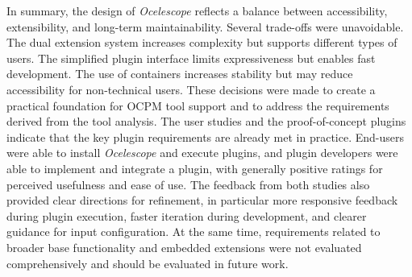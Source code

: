 In summary, the design of \textit{Ocelescope} reflects a balance between accessibility, extensibility, and long-term maintainability.
Several trade-offs were unavoidable.
The dual extension system increases complexity but supports different types of users.
The simplified plugin interface limits expressiveness but enables fast development.
The use of containers increases stability but may reduce accessibility for non-technical users.
These decisions were made to create a practical foundation for OCPM tool support and to address the requirements derived from the tool analysis.
The user studies and the proof-of-concept plugins indicate that the key plugin requirements are already met in practice.
End-users were able to install \textit{Ocelescope} and execute plugins, and plugin developers were able to implement and integrate a plugin, with generally positive ratings for perceived usefulness and ease of use.
The feedback from both studies also provided clear directions for refinement, in particular more responsive feedback during plugin execution, faster iteration during development, and clearer guidance for input configuration.
At the same time, requirements related to broader base functionality and embedded extensions were not evaluated comprehensively and should be evaluated in future work.
